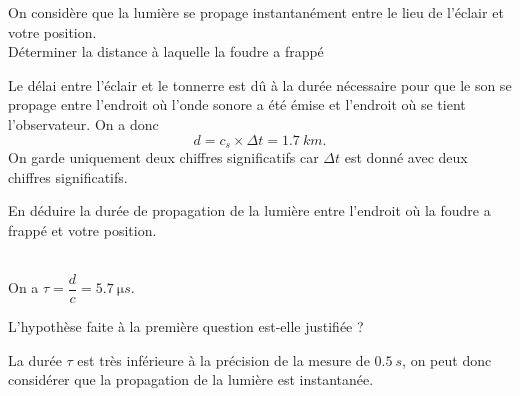 \begin{enonce}
On considère que la lumière se propage instantanément entre le lieu de l'éclair et votre position.\\ Déterminer la distance à laquelle la foudre a frappé
\end{enonce}


\begin{corrige}
Le délai entre l'éclair et le tonnerre est dû à la durée nécessaire pour que le son se propage entre l'endroit où l'onde sonore a été émise et l'endroit où se tient l'observateur. On a donc 
\begin{equation*}
d=c_s\times\Delta t=\SI{1,7}{km}.
\end{equation*}
On garde uniquement deux chiffres significatifs car $\Delta t$ est donné avec deux chiffres significatifs.
\end{corrige}



\begin{enonce}
En déduire la durée de propagation de la lumière entre l'endroit où la foudre a frappé et votre position. \\ \mbox{ }
\end{enonce}


\begin{corrige}
On a $\tau=\dfrac{d}{c}=\SI{5,7}{\micro s}$.
\end{corrige}



\begin{enonce}
L'hypothèse faite à la première question est-elle justifiée ?
\end{enonce}


\begin{corrige}
La durée $\tau$ est très inférieure à la précision de la mesure de $\SI{0,5}{s}$, on peut donc considérer que la propagation de la lumière est instantanée.
\end{corrige}

